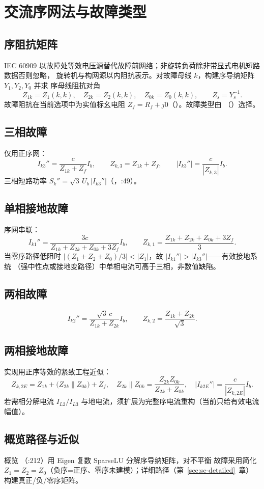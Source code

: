 \section{交流序网法与故障类型}\label{sec:sc-ac}

\subsection{序阻抗矩阵}
IEC 60909 以故障处等效电压源替代故障前网络；非旋转负荷除非带显式电机短路数据否则忽略，
旋转机与构网源以内阻抗表示。对故障母线 $k$，构建序导纳矩阵 $Y_1,Y_2,Y_0$ 并求
序母线阻抗对角
\begin{equation}
Z_{1k}=Z_1(k,k),\quad Z_{2k}=Z_2(k,k),\quad Z_{0k}=Z_0(k,k),\qquad Z_s=Y_s^{-1}.
\end{equation}
故障阻抗在当前选项中为实值标幺电阻 $Z_f=R_f+j0$（）。故障类型由
（）选择。

\subsection{三相故障}
仅用正序网：
\begin{equation}
I_{k3}''=\frac{c}{Z_{1k}+Z_f}I_b,\qquad Z_{k,3}=Z_{1k}+Z_f,\qquad |I_{k3}''|=\frac{c}{|Z_{k,3}|}I_b.
\end{equation}
三相短路功率 $S_k''=\sqrt3\,U_b\,|I_{k3}''|$（，:49）。

\subsection{单相接地故障}
序网串联：
\begin{equation}
I_{k1}''=\frac{3c}{Z_{1k}+Z_{2k}+Z_{0k}+3Z_f}I_b,\qquad
Z_{k,1}=\frac{Z_{1k}+Z_{2k}+Z_{0k}+3Z_f}{3}.
\end{equation}
当零序路径低阻时 $|(Z_1{+}Z_2{+}Z_0)/3|<|Z_1|$，故 $|I_{k1}''|>|I_{k3}''|$——有效接地系统
（强中性点或接地变路径）中单相电流可高于三相，非数值缺陷。

\subsection{两相故障}
\begin{equation}
I_{k2}''=\frac{\sqrt3\,c}{Z_{1k}+Z_{2k}}I_b,\qquad Z_{k,2}=\frac{Z_{1k}+Z_{2k}}{\sqrt3}.
\end{equation}

\subsection{两相接地故障}
实现用正序等效的紧致工程近似：
\begin{equation}
Z_{k,2E}=Z_{1k}+\big(Z_{2k}\parallel Z_{0k}\big)+Z_f,\quad
Z_{2k}\parallel Z_{0k}=\frac{Z_{2k}Z_{0k}}{Z_{2k}+Z_{0k}},\quad
|I_{k2E}''|=\frac{c}{|Z_{k,2E}|}I_b.
\end{equation}
若需相分解电流 $I_{L2}/I_{L3}$ 与地电流，须扩展为完整序电流重构（当前只给有效电流幅值）。

\subsection{概览路径与近似}
概览 （:212）用 Eigen 复数 SparseLU 分解序导纳矩阵，对不平衡
故障采用简化 $Z_1{=}Z_2{=}Z_0$（负序=正序、零序未建模）；详细路径（第~\ref{sec:sc-detailed}~章）
构建真正/负/零序矩阵。
